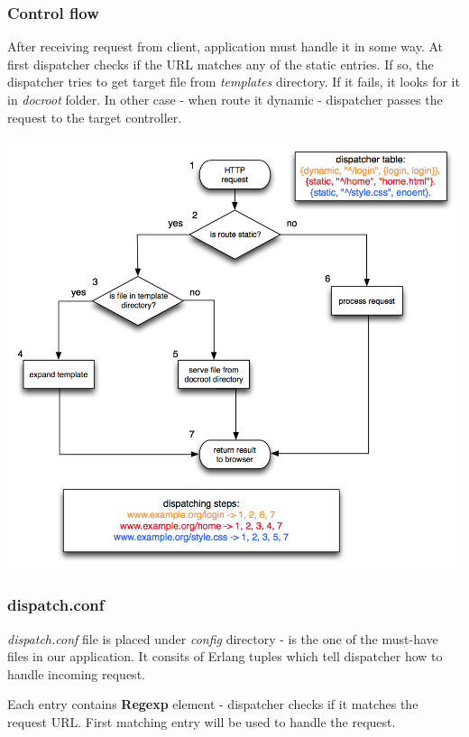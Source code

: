 \subsubsection{Control flow}After receiving request from client, application must handle it in some way. 
At first dispatcher checks if the URL matches any of the static entries. 
If so, the dispatcher tries to get target file from {\it templates} directory. 
If it fails, it looks for it in {\it docroot} folder. In other case - when route it dynamic - dispatcher passes the request to the target controller.

\includegraphics[width=\textwidth]{images/dispatch.jpg}

\subsubsection{dispatch.conf}{\it dispatch.conf} file is placed under {\it config} directory - is the one of the must-have files in our application. 
It consits of Erlang tuples which tell dispatcher how to handle incoming request. 

Each entry contains {\bf Regexp} element - dispatcher checks if it matches the request URL. 
First matching entry will be used to handle the request.

